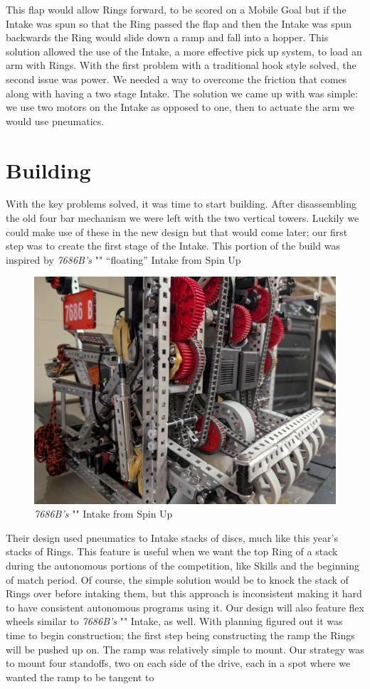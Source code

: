 This flap would allow Rings forward, to be scored on a Mobile Goal but if the Intake was spun so that the Ring passed the flap and then the Intake was spun backwards the Ring would slide down a ramp and fall into a hopper. This solution allowed the use of the Intake, a more effective pick up system, to load an arm with Rings. With the first problem with a traditional hook style solved, the second issue was power. We needed a way to overcome the friction that comes along with having a two stage Intake. The solution we came up with was simple: we use two motors on the Intake as opposed to one, then to actuate the arm we would use pneumatics. 

\section*{Building}
With the key problems solved, it was time to start building. After disassembling the old four bar mechanism we were left with the two vertical towers. Luckily we could make use of these in the new design but that would come later; our first step was to create the first stage of the Intake. This portion of the build was inspired by \textit{7686B's} "\cite{7686b}" “floating” Intake from Spin Up 
\begin{figure}[H]
    \centering
    \includegraphics[width=0.5\linewidth]{images/bteamsfloatingintake.jpg}
    \caption{\textit{7686B's} "\cite{7686b}" Intake from Spin Up}
\end{figure}
Their design used pneumatics to Intake stacks of discs, much like this year's stacks of Rings. This feature is useful when we want the top Ring of a stack during the autonomous portions of the competition, like Skills and the beginning of match period. Of course, the simple solution would be to knock the stack of Rings over before intaking them, but this approach is inconsistent making it hard to have consistent autonomous programs using it. Our design will also feature flex wheels similar to \textit{7686B's} "\cite{7686b}" Intake, as well. With planning figured out it was time to begin construction; the first step being constructing the ramp the Rings will be pushed up on. The ramp was relatively simple to mount. Our strategy was to mount four standoffs, two on each side of the drive, each in a spot where we wanted the ramp to be tangent to 
